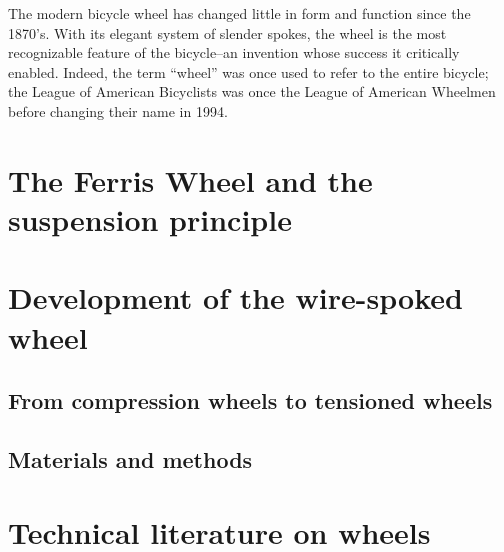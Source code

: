 \documentclass[../thesis.tex]{subfiles}
\begin{document}
The modern bicycle wheel has changed little in form and function since the 1870's. With its elegant system of slender spokes, the wheel is the most recognizable feature of the bicycle--an invention whose success it critically enabled. Indeed, the term ``wheel'' was once used to refer to the entire bicycle; the League of American Bicyclists was once the League of American Wheelmen before changing their name in 1994.

\section{}


\section{The Ferris Wheel and the suspension principle}

\section{Development of the wire-spoked wheel}
\subsection{From compression wheels to tensioned wheels}
\subsection{Materials and methods}

\section{Technical literature on wheels}
\end{document}
